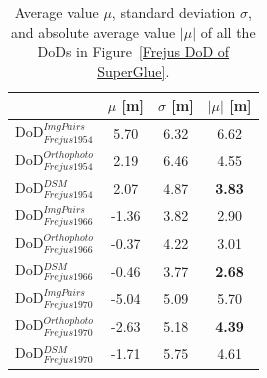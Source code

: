 \begin{table}%
	\footnotesize
	\centering
	\begin{tabular}{||l|c|c|c||}\hline
		&$\mu$ [m]&$\sigma$ [m]&$|\mu|$ [m]\\\hline\hline
		DoD$_{Frejus1954}^{ImgPairs}$ & 5.70 & 6.32 & 6.62\\
		DoD$_{Frejus1954}^{Orthophoto}$ & 2.19 & 6.46 & 4.55\\
		DoD$_{Frejus1954}^{DSM}$ & 2.07 & 4.87 & \textbf{3.83}\\\hline
		DoD$_{Frejus1966}^{ImgPairs}$ & -1.36 & 3.82 & 2.90\\
		DoD$_{Frejus1966}^{Orthophoto}$ & -0.37 & 4.22 & 3.01\\
		DoD$_{Frejus1966}^{DSM}$ & -0.46 & 3.77 & \textbf{2.68}\\\hline
		DoD$_{Frejus1970}^{ImgPairs}$ & -5.04 & 5.09 & 5.70\\
		DoD$_{Frejus1970}^{Orthophoto}$ & -2.63 & 5.18 & \textbf{4.39}\\
		DoD$_{Frejus1970}^{DSM}$ & -1.71 & 5.75 & 4.61\\\hline
	\end{tabular}
	\caption{Average value $\mu$, standard deviation $\sigma$, and absolute average value $|\mu|$ of all the DoDs in Figure~\ref{Frejus DoD of SuperGlue}.}
	\label{CheckptAcuracy}
\end{table}




